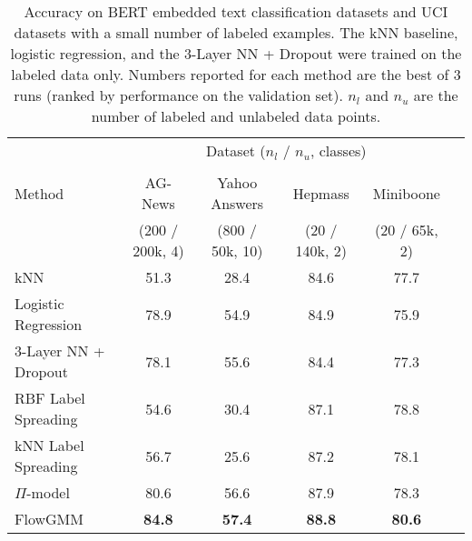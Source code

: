 \documentclass{article}
\begin{document}
\begin{table*}[t]
	\centering
	\caption{
	Accuracy on BERT embedded text classification datasets and UCI datasets with a small number of labeled examples. The kNN baseline, logistic regression, and the 3-Layer NN + Dropout were trained on the labeled data only. Numbers reported for each method are the best of $3$ runs (ranked by performance on the validation set). $n_l$ and $n_u$ are the number of labeled and unlabeled data points.
    }
	\label{tab:ssl_tab}
	\small
	\begin{tabular}{lccccc}
	    & \multicolumn{4}{c}{Dataset ($n_l$ / $n_u$, classes)}  \\
        \cmidrule(r){2-5}
	    \\[-0.3cm]
	    Method                    & AG-News  
                                  & Yahoo Answers
                                  & Hepmass 
                                  & Miniboone\\
                                  & (200 / 200k, 4)
                                  & (800 / 50k, 10)
                                  & (20 / 140k, 2)
                                  & (20 / 65k, 2)
                                  \\
                                  \midrule
        kNN & 51.3 & 28.4 & 84.6 & 77.7 \\
        Logistic Regression & 78.9 & 54.9 & 84.9 & 75.9 \\
        3-Layer NN + Dropout & 78.1 & 55.6 & 84.4 & 77.3 \\
        \midrule
        RBF Label Spreading & 54.6 & 30.4 & 87.1 & 78.8 \\
        kNN Label Spreading & 56.7 & 25.6 & 87.2 & 78.1 \\
        $\Pi$-model & 80.6 & 56.6 & 87.9 & 78.3 \\
        FlowGMM & \textbf{84.8} & \textbf{57.4} & \textbf{88.8} & \textbf{80.6} \\

	\end{tabular}
\end{table*}
\end{document}
